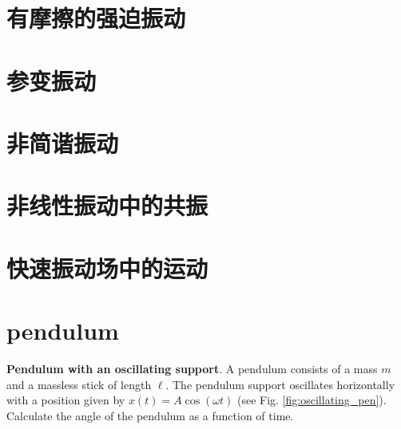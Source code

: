\documentclass[11pt,a4paper]{article}
\begin{document}
\section{有摩擦的强迫振动}
\cite{2007理论物理学教程} 



















\section{参变振动}
\cite{2007理论物理学教程} 















\section{非简谐振动}
\cite{2007理论物理学教程} 









\section{非线性振动中的共振}
\cite{2007理论物理学教程} 







\section{快速振动场中的运动}
\cite{2007理论物理学教程} 









\section{pendulum}
\cite{morin2008introduction} \textbf{Pendulum with an oscillating support}. A pendulum consists of a mass $m$ and a massless stick of length $\ell$. The pendulum support oscillates horizontally with a position given by $x(t) = A \cos(\omega t)$ (see Fig. \ref{fig:oscillating_pen}). Calculate the angle of the pendulum as a function of time.
\end{document}
